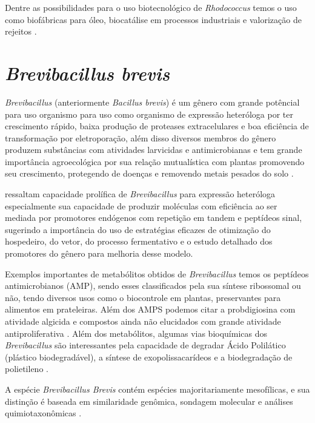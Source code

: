 Dentre as possibilidades para o uso biotecnológico de \textit{Rhodococcus} temos o uso como biofábricas 
para óleo, biocatálise em processos industriais e valorização de rejeitos \cite{alvarez2021,krivoruchko2019,anthony2019,chatterjee2020}.

\section{\textit{Brevibacillus brevis}}
\textit{Brevibacillus} (anteriormente \textit{Bacillus brevis}) é um gênero com grande potêncial para uso organismo para uso como organismo de expressão heteróloga
por ter crescimento rápido, baixa produção de proteases extracelulares e boa eficiência de transformação
por eletroporação, além disso diversos membros do gênero produzem substâncias com atividades 
larvicidas e antimicrobianas e tem grande importância agroecológica por sua relação mutualística
com plantas promovendo seu crescimento, protegendo de doenças e removendo metais pesados do solo
\cite{panda2014brevibacillus,ray2020brevibacillus}.  

 ressaltam  capacidade prolífica de \textit{Brevibacillus} para expressão heteróloga
especialmente sua capacidade de produzir moléculas com eficiência ao ser mediada por promotores endógenos
com repetição em tandem e peptídeos sinal, sugerindo a importância do uso de estratégias eficazes de otimização do hospedeiro, do vetor,
do processo fermentativo e o estudo detalhado dos promotores do gênero para melhoria desse modelo.

Exemplos importantes de metabólitos obtidos de \textit{Brevibacillus} temos os peptídeos antimicrobianos (AMP),
sendo esses classificados pela sua síntese ribossomal ou não, tendo diversos usos como o biocontrole em plantas, preservantes
para alimentos em prateleiras\cite{yang2018antimicrobial}. Além dos AMPS podemos citar a probdigiosina com atividade algicida e compostos ainda não
elucidados com grande atividade antiproliferativa \cite{zhang2022transcriptome,arumugam2018isolation}.
Além dos metabólitos, algumas vias bioquímicas dos \textit{Brevibacillus} são interessantes pela capacidade de
degradar Ácido Polilático (plástico biodegradável), a síntese de exopolissacarídeos e a 
biodegradação de polietileno \cite{yu2022comparison,yildiz2015genomic,hadad2005biodegradation,ali2022screening}.

A espécie \textit{Brevibacillus Brevis} contém espécies majoritariamente mesofílicas, e
sua distinção é baseada em similaridade genômica, sondagem molecular e análises 
quimiotaxonômicas \cite{ray2020brevibacillus}.  

